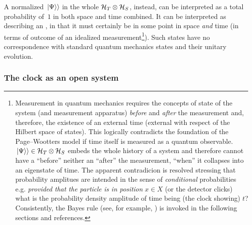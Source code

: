 A normalized $\left.\left| \Psi \right\rangle\right\rangle$ in the whole $\mathcal{H}_T \otimes \mathcal{H}_S$,
instead,
can be interpreted as a total probability of~$1$ in both space and time combined.
It can be interpreted as describing an ,
in that it
must certainly be in some point in space
\emph{and} time (in terms of outcome of an idealized measurement\footnote{
  Measurement in quantum mechanics requires the concepts
  of state of the system
  (and measurement apparatus)
  \emph{before} and \emph{after} the measurement and, therefore, the existence
  of an external time (external with respect of the Hilbert space of states).
  This logically contradicts the foundation of the Page--Wootters model if
  time itself is measured as a quantum observable. $\left.\left| \Psi \right\rangle\right\rangle \in \mathcal{H}_T \otimes \mathcal{H}_S$
  embeds the whole history of a system and therefore cannot have a
  ``before'' neither an ``after'' the measurement, ``when'' it collapses
  into an eigenstate of time. The apparent contradicion is resolved
  stressing that probability amplitues are intended in the sense of
  \emph{conditional} probabilities e.g. \emph{provided that the particle
  is in position} $x \in X$ (or the detector clicks)
  what is the probability density amplitude of time being (the clock showing) $t$?
  Consistently, the Bayes rule
  (see, for example, \cite{Stat:Conditional})
  is invoked in the following sections
  and references.
}).
Such states have no correspondence with standard quantum mechanics states and their unitary evolution.

\subsubsection*{The clock as an open system}

